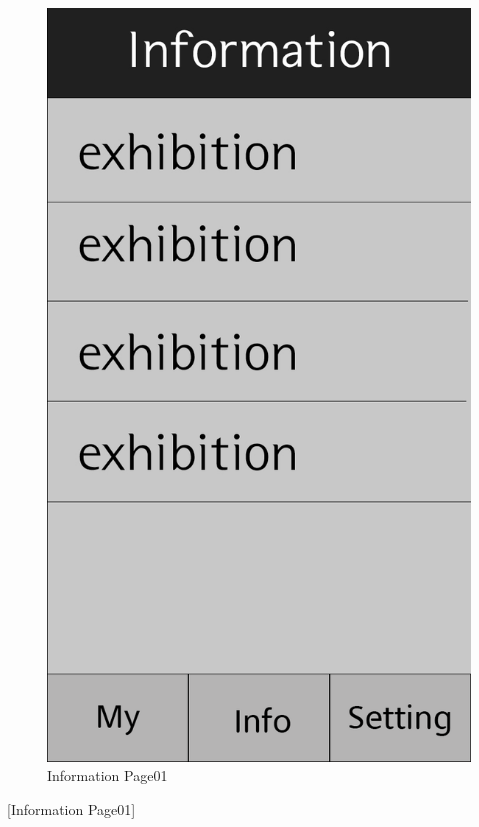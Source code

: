 \documentclass[conference]{IEEEtran}
\begin{document}
\begin{figure}[htbp]
\begin{center}
    \includegraphics[scale=0.2]{img_Info01}
    \caption{Information Page01} 
\end{center}
\end{figure}

[Information Page01]
\end{document}
